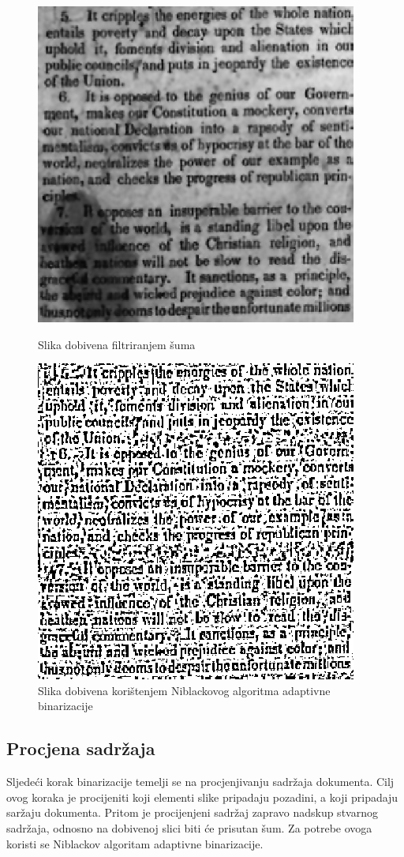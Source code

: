 \documentclass[times, utf8, zavrsni, numeric]{fer}
\begin{document}
\begin{figure}[!ht]
\centering
\begin{minipage}{.5\textwidth}
    \centering
    \includegraphics[width=.7\linewidth]{Images/Wiener.png}
    \caption{Slika dobivena filtriranjem šuma}
    \label{fig:wiener}
\end{minipage}%
\begin{minipage}{.5\textwidth}
    \centering
    \includegraphics[width=.7\linewidth]{Images/Niblack.png}
    \captionsetup{justification=centering}
    \caption{Slika dobivena korištenjem Niblackovog algoritma adaptivne binarizacije}
    \label{fig:niblack}
\end{minipage}
\end{figure}

\subsection{Procjena sadržaja}
Sljedeći korak binarizacije temelji se na procjenjivanju sadržaja dokumenta. 
Cilj ovog koraka je procijeniti koji elementi slike pripadaju pozadini, a koji pripadaju saržaju dokumenta. 
Pritom je procijenjeni sadržaj zapravo nadskup stvarnog sadržaja, odnosno na dobivenoj slici biti će prisutan šum. 
Za potrebe ovoga koristi se Niblackov algoritam adaptivne binarizacije. \cite{AdaptiveBinarization}\\
\end{document}
